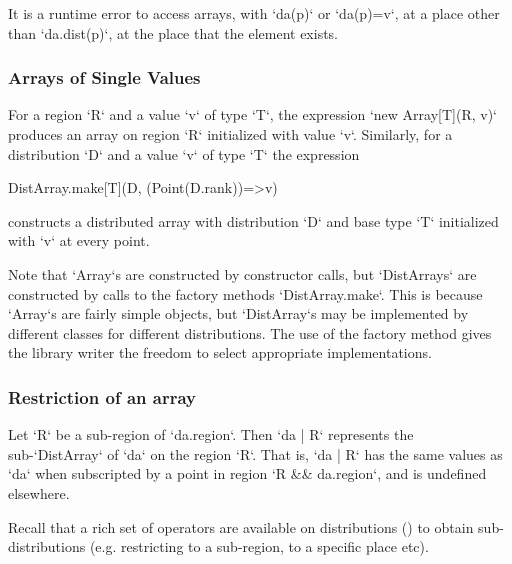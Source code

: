It is a runtime error to 
access arrays, with \xcd`da(p)` or \xcd`da(p)=v`, at a place
other than \xcd`da.dist(p)`, \viz{} at the place that the element exists. 


\subsubsection{Arrays of Single Values}\label{ConstantArray}

For a region \xcd`R` and a value \xcd`v` of type \xcd`T`, the expression 
\xcd`new Array[T](R, v)` 
produces an array on region \xcd`R` initialized with value \xcd`v`.
Similarly, 
for a distribution \xcd`D` and a value \xcd`v` of
type \xcd`T` the expression 
\begin{xtenmath}
DistArray.make[T](D, (Point(D.rank))=>v)
\end{xtenmath}
constructs a distributed array with
distribution \xcd`D` and base type \xcd`T` initialized with \xcd`v`
at every point.

Note that \xcd`Array`s are constructed by constructor calls, but
\xcd`DistArrays` are constructed by calls to the factory methods
\xcd`DistArray.make`. This is because \xcd`Array`s are fairly simple objects,
but \xcd`DistArray`s may be implemented by different classes for different
distributions. The use of the factory method gives the library writer the
freedom to select appropriate implementations.


\subsubsection{Restriction of an array}

Let \xcd`R` be a sub-region of \xcd`da.region`. Then 
\xcd`da | R`
represents the sub-\xcd`DistArray` of \xcd`da` on the region \xcd`R`.
That is, \xcd`da | R` has the same values as \xcd`da` when subscripted by a
point in region \xcd`R && da.region`, and is undefined elsewhere.

Recall that a rich set of operators are available on distributions
() to obtain sub-distributions
(e.g. restricting to a sub-region, to a specific place etc).


